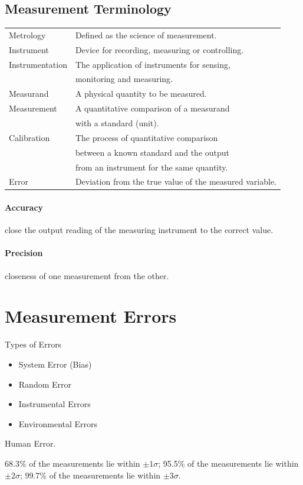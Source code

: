 \documentclass[a4paper,UTF8]{article}
\theoremstyle{mystyle}{
  \newtheorem{law}{Law}
}
\begin{document}
\subsection{Measurement Terminology}
\begin{tabular}{|l|l|}
\hline
Metrology 		& Defined as the science of measurement.\\
Instrument 		& Device for recording, measuring or controlling.\\
Instrumentation & The application of instruments for sensing,\\
				& monitoring and measuring.\\
Measurand 		& A physical quantity to be measured.\\
Measurement 	& A quantitative comparison of a measurand \\
				& with a standard (unit).\\
Calibration 	& The process of quantitative comparison \\
				& between a known  standard and the output \\
				& from an instrument for the same quantity. \\
Error 			& Deviation from the true value of the measured variable.\\
\hline
\end{tabular}

\paragraph{Accuracy}
 close the output reading of the measuring instrument to
the correct value.

\paragraph{Precision}
 closeness of one measurement from the other.

\section{Measurement Errors}
Types of Errors
\begin{itemize}
\item System Error (Bias)
\item Random Error
\item Instrumental Errors
\item Environmental Errors
\end{itemize}
Human Error.

68.3\% of the measurements lie
within $\pm 1 \sigma$;
 95.5\% of the measurements lie
within $\pm 2 \sigma$;
 99.7\% of the measurements lie
within $\pm 3 \sigma$.
\end{document}
